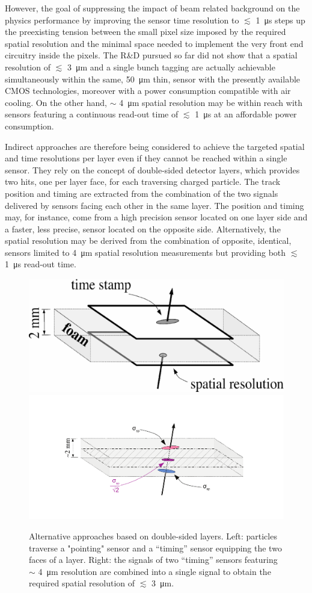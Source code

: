   However, the goal of suppressing the impact of beam related background 
on the physics performance by improving the sensor time resolution to 
$\lesssim$ \SI{1}{\micro\second} steps up the preexisting tension between the 
small pixel size imposed by the required spatial resolution and the 
minimal space needed to implement the very front end circuitry inside 
the pixels. The R\&D pursued so far did not show that a spatial 
resolution of $\lesssim$ \SI{3}{\micro\meter} and a single bunch tagging are 
actually achievable simultaneously within the same, \SI{50}{\micro\meter} thin, 
sensor with the presently available CMOS technologies, moreover with 
a power consumption compatible with air cooling. On the other hand, 
$\sim$ \SI{4}{\micro\meter} spatial resolution may be within reach with sensors 
featuring a continuous read-out time of $\lesssim$ \SI{1}{\micro\second} at an 
affordable power consumption.

  Indirect approaches are therefore being considered to achieve the 
targeted spatial and time resolutions per layer even if they cannot be
reached within a single sensor. They rely on the concept of double-sided detector layers, which provides two hits, one per layer face, for each traversing charged particle. The track 
position and timing are extracted from the combination of the two 
signals delivered by sensors facing each other in the same layer. 
The position and timing may, for instance, come from a high precision 
sensor located on one layer side and a faster, less precise, sensor 
located on the opposite side. Alternatively, the spatial resolution 
may be derived from the combination of opposite, identical, sensors 
limited to \SI{4}{\micro\meter} spatial resolution measurements but providing 
both $\lesssim$ \SI{1}{\micro\second} read-out time.     

\begin{figure}
	\centering
	\includegraphics[width=.43\linewidth]{VertexDetector/CMOS/principe-MixedLayers-noPixels.eps}
	\includegraphics[width=.55\linewidth]{VertexDetector/CMOS/principe-MixedLayers-intermediatePoint.pdf}
	\caption{Alternative approaches based on double-sided layers. Left: particles traverse a "pointing" sensor and a ``timing'' sensor equipping the two faces of a layer. Right: the signals of two ``timing'' sensors featuring $\sim$ \SI{4}{\micro\meter} resolution are combined into a single signal to obtain the required spatial resolution of $\lesssim$ \SI{3}{\micro\meter}.}
	\label{fig:VertexDetector:CMOS:minivectors}
\end{figure}

